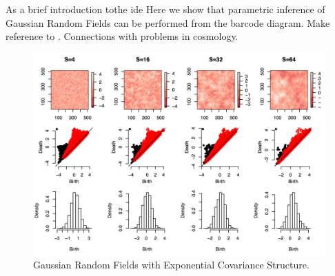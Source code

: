 As a brief introduction tothe ide
Here we show that parametric inference of Gaussian Random Fields can be performed from the barcode diagram.
Make reference to \cite{Adler:2010}.
Connections with problems in cosmology.


\begin{figure}
\centering
\includegraphics[width=\textwidth]{fig/parametric_inference/expCov.png}
\caption[Gaussian Random Fields with Exponential Covariance Structure]{Gaussian Random Fields with Exponential Covariance Structure.}
\label{fig:parametric_inference:expCov}
\end{figure}

